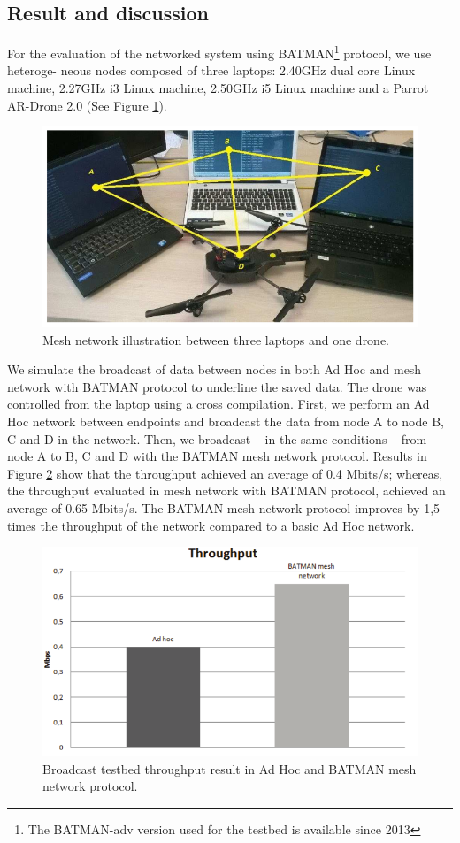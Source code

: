 \documentclass[11pt,openany]{book}
\begin{document}
\subsection{Result and discussion}
For the evaluation of the networked system using BATMAN\footnote{The BATMAN-adv version used for the testbed is available since 2013} protocol, we use heteroge- neous nodes composed of three laptops: 2.40GHz dual core Linux machine, 2.27GHz i3 Linux machine, 2.50GHz i5 Linux machine and a Parrot AR-Drone 2.0 (See Figure \ref{fig:4.3}).
\begin{figure}[H]
    \centering
    \includegraphics[scale=0.3]{assets/4_3.png}
    \caption{Mesh network illustration between three laptops and one drone.}
    \label{fig:4.3}
\end{figure}
We simulate the broadcast of data between nodes in both Ad Hoc and mesh network with BATMAN protocol to underline the saved data. The drone was controlled from the laptop using a cross compilation. First, we perform an Ad Hoc network between endpoints and broadcast the data from node A to node B, C and D in the network. Then, we broadcast – in the same conditions – from node A to B, C and D with the BATMAN mesh network protocol. Results in Figure \ref{fig:4.4} show that the throughput achieved an average of 0.4 Mbits/s; whereas, the throughput evaluated in mesh network with BATMAN protocol, achieved an average of 0.65 Mbits/s. The BATMAN mesh network protocol improves by 1,5 times the throughput of the network compared to a basic Ad Hoc network.
\begin{figure}[H]
    \centering
    \includegraphics[scale=0.4]{assets/4_4.png}
    \caption{Broadcast testbed throughput result in Ad Hoc and BATMAN mesh network protocol.}
    \label{fig:4.4}
\end{figure}
\end{document}
